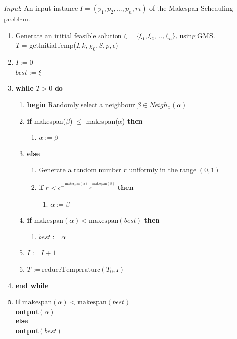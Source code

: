\documentclass[12pt,a4paper,reqno]{article}
\begin{document}
\emph{Input}: An input instance $I = (p_1,p_2,...,p_n,m)$ of the Makespan Scheduling problem.
\begin{enumerate}
\item Generate an initial feasible solution $\xi = \{\xi_1,\xi_2,...,\xi_n\}$, using GMS. \\
$T$ = getInitialTemp($I, k, \chi_0, S, p, \epsilon$)
\item $I := 0$ \\
$best:=\xi$
\item\textbf{while} $T>0$ \textbf{do}
\begin{enumerate}
\item \textbf{begin} Randomly select a neighbour $\beta\in Neigh_x(\alpha)$
\item \textbf{if} makespan($\beta$) $\leq$ makespan($\alpha$) \textbf{then}
\begin{enumerate}
\item $\alpha:=\beta$
\end{enumerate}
\item[] \textbf{else}
\begin{enumerate}
\item Generate a random number $r$ uniformly in the range $(0,1)$
\item \textbf{if} $r<e^{-\frac{\text{makespan}(\alpha)-\text{makespan}(\beta)}{T}}$ \textbf{then}
\begin{enumerate}
\item[] $\alpha:=\beta$
\end{enumerate}
\end{enumerate}
\item \textbf{if}
$\text{makespan}(\alpha) < \text{makespan}(best)$ \textbf{then}
\begin{enumerate}
\item[] $best:=\alpha$
\end{enumerate}
\item $I:=I+1$
\item $T:=\text{reduceTemperature}(T_0,I)$
\end{enumerate}
\item[] \textbf{end while}
\item \textbf{if} $\text{makespan}(\alpha) < \text{makespan}(best)$ \\
\indent \textbf{output}$(\alpha)$ \\
\textbf{else} \\
\indent \textbf{output}$(best)$
\end{enumerate}
\end{document}
